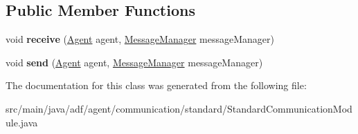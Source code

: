 \subsection*{Public Member Functions}
\begin{DoxyCompactItemize}
\item 
\hypertarget{classadf_1_1agent_1_1communication_1_1standard_1_1StandardCommunicationModule_ada0c0f0a7092156d2d4c1e64792e683a}{}\label{classadf_1_1agent_1_1communication_1_1standard_1_1StandardCommunicationModule_ada0c0f0a7092156d2d4c1e64792e683a} 
void {\bfseries receive} (\hyperlink{classadf_1_1agent_1_1Agent}{Agent} agent, \hyperlink{classadf_1_1agent_1_1communication_1_1MessageManager}{Message\+Manager} message\+Manager)
\item 
\hypertarget{classadf_1_1agent_1_1communication_1_1standard_1_1StandardCommunicationModule_a0a11dffa4589a95226127fdd834d4ba0}{}\label{classadf_1_1agent_1_1communication_1_1standard_1_1StandardCommunicationModule_a0a11dffa4589a95226127fdd834d4ba0} 
void {\bfseries send} (\hyperlink{classadf_1_1agent_1_1Agent}{Agent} agent, \hyperlink{classadf_1_1agent_1_1communication_1_1MessageManager}{Message\+Manager} message\+Manager)
\end{DoxyCompactItemize}


The documentation for this class was generated from the following file\+:\begin{DoxyCompactItemize}
\item 
src/main/java/adf/agent/communication/standard/Standard\+Communication\+Module.\+java\end{DoxyCompactItemize}
